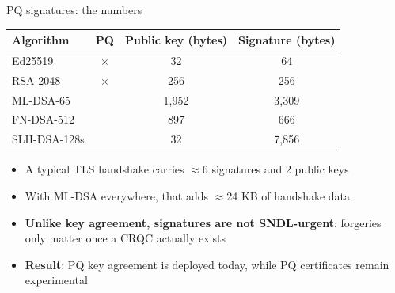 \ifdefined\PRESENTATION\else\PassOptionsToClass{handout}{beamer}\fi\documentclass[aspectratio=169, lualatex]{beamer}
\begin{document}
\begin{frame}{PQ signatures: the numbers}
	\begin{center}
		\begin{tabular}{|l|c|c|c|}
			\hline
			\textbf{Algorithm} & \textbf{PQ}  & \textbf{Public key (bytes)} & \textbf{Signature (bytes)} \\
			\hline
			Ed25519            & $\times$     & 32                          & 64                         \\
			RSA-2048           & $\times$     & 256                         & 256                        \\
			ML-DSA-65          & \mycheckmark & 1,952                       & 3,309                      \\
			FN-DSA-512         & \mycheckmark & 897                         & 666                        \\
			SLH-DSA-128s       & \mycheckmark & 32                          & 7,856                      \\
			\hline
		\end{tabular}
	\end{center}
	\begin{itemize}
		\item A typical TLS handshake carries $\approx$6 signatures and 2 public keys
		\item With ML-DSA everywhere, that adds $\approx$24 KB of handshake data
		\item \textbf{Unlike key agreement, signatures are not SNDL-urgent}: forgeries only matter once a CRQC actually exists
		\item \textbf{Result}: PQ key agreement is deployed today, while PQ certificates remain experimental
	\end{itemize}
\end{frame}
\end{document}
